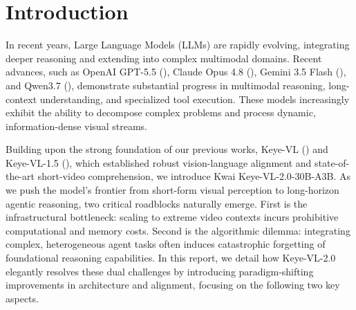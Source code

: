 \documentclass{llmxive}
\begin{document}



{
  \tableofcontents
  \noindent\hrulefill
}



\section{Introduction}
In recent years, Large Language Models (LLMs) are rapidly evolving, integrating deeper reasoning and extending into complex multimodal domains. Recent advances, such as OpenAI GPT-5.5 (\cite{openai2026gpt55}), Claude Opus 4.8 (\cite{anthropic2026claude}), Gemini 3.5 Flash (\cite{deepmind2026gemini}), and Qwen3.7 (\cite{qwenteam2026qwen}), demonstrate substantial progress in multimodal reasoning, long-context understanding, and specialized tool execution. These models increasingly exhibit the ability to decompose complex problems and process dynamic, information-dense visual streams. 

Building upon the strong foundation of our previous works, Keye-VL (\cite{kwaikeye2025vl}) and Keye-VL-1.5 (\cite{yang2025kwaikeyevl15}), which established robust vision-language alignment and state-of-the-art short-video comprehension, we introduce Kwai Keye-VL-2.0-30B-A3B. As we push the model's frontier from short-form visual perception to long-horizon agentic reasoning, two critical roadblocks naturally emerge. First is the infrastructural bottleneck: scaling to extreme video contexts incurs prohibitive computational and memory costs. Second is the algorithmic dilemma: integrating complex, heterogeneous agent tasks often induces catastrophic forgetting of foundational reasoning capabilities. In this report, we detail how Keye-VL-2.0 elegantly resolves these dual challenges by introducing paradigm-shifting improvements in architecture and alignment, focusing on the following two key aspects.
\end{document}

